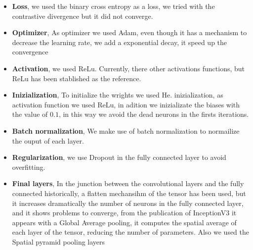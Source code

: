 \documentclass[12pt, a4paper, titlepage,twoside,openright]{article}
\begin{document}
\begin{itemize}

\item \textbf{Loss}, we used the binary cross entropy as a loss, we tried with the contrastive divergence but it did not converge.

\item \textbf{Optimizer}, As optimizer we used Adam, even though it has a mechanism to decrease the learning rate, we add a exponential decay, it speed up the convergence

\item \textbf{Activation}, we used ReLu. Currently, there other activations functions, but ReLu has been stablished as the reference.

\item \textbf{Inizialization}, To initialize the wrights we used He. inizialization, as activation function we used ReLu, in adition we inizializate the biases with the value of $0.1$, in this way we avoid the dead neurons in the firsts iterations.

\item \textbf{Batch normalization}, We make use of batch normalization to normailize the ouput of each layer.

\item \textbf{Regularization}, we use Dropout in the fully connected layer to avoid overfitting.


\item \textbf{Final layers}, In the junction between the convolutional layers and the fully connected historically, a flatten mechansihm of the tensor has been used, but it increases dramatically the number of neurons in the fully connected layer, and it shows problems to converge, from the publication of InceptionV3 it appears with a Global Average pooling, it computes the spatial average of each layer of the tensor, reducing the number of parameters. Also we used the Spatial pyramid pooling layers

\begin{figure}[H]
		
\centering


\end{figure}
\end{itemize}
\end{document}

